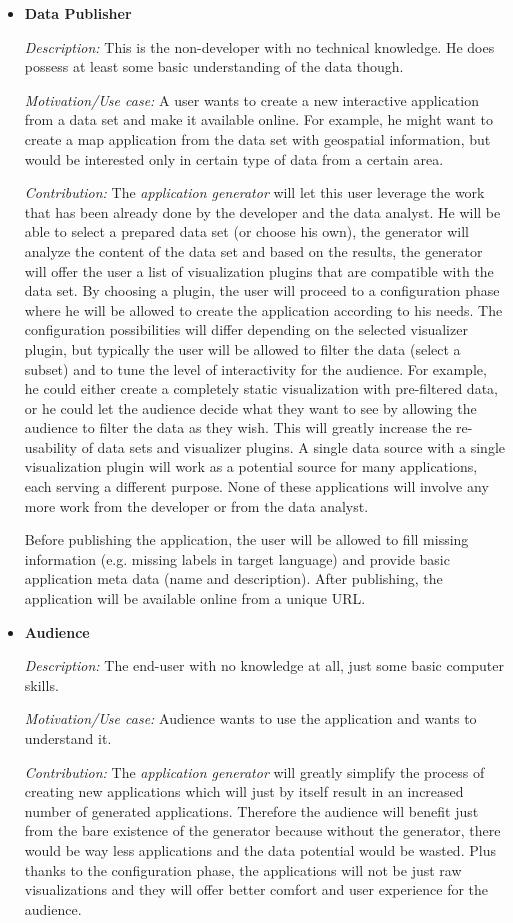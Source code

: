 \begin{itemize}
\item \textbf{Data Publisher}

\textit{Description: }This is the non-developer with no technical knowledge. He does possess at least some basic understanding of the data though.

\textit{Motivation/Use case: }A user wants to create a new interactive application from a data set and make it available online. For example, he might want to create a map application from the data set with geospatial information, but would be interested only in certain type of data from a certain area.

\textit{Contribution: }The \emph{application generator} will let this user leverage the work that has been already done by the developer and the data analyst. He will be able to select a prepared data set (or choose his own), the generator will analyze the content of the data set and based on the results, the generator will offer the user a list of visualization plugins that are compatible with the data set. By choosing a plugin, the user will proceed to a configuration phase where he will be allowed to create the application according to his needs. The configuration possibilities will differ depending on the selected visualizer plugin, but typically the user will be allowed to filter the data (select a subset) and to tune the level of interactivity for the audience. For example, he could either create a completely static visualization with pre-filtered data, or he could let the audience decide what they want to see by allowing the audience to filter the data as they wish. This will greatly increase the re-usability of data sets and visualizer plugins. A single data source with a single visualization plugin will work as a potential source for many applications, each serving a different purpose. None of these applications will involve any more work from the developer or from the data analyst.

Before publishing the application, the user will be allowed to fill missing information (e.g. missing labels in target language) and provide basic application meta data (name and description). After publishing, the application will be available online from a unique URL.

\item \textbf{Audience}

\textit{Description:} The end-user with no knowledge at all, just some basic computer skills.

\textit{Motivation/Use case:} Audience wants to use the application and wants to understand it.

\textit{Contribution:} The \emph{application generator} will greatly simplify the process of creating new applications which will just by itself result in an increased number of generated applications. Therefore the audience will benefit just from the bare existence of the generator because without the generator, there would be way less applications and the data potential would be wasted. Plus thanks to the configuration phase, the applications will not be just raw visualizations and they will offer better comfort and user experience for the audience.

\end{itemize}

